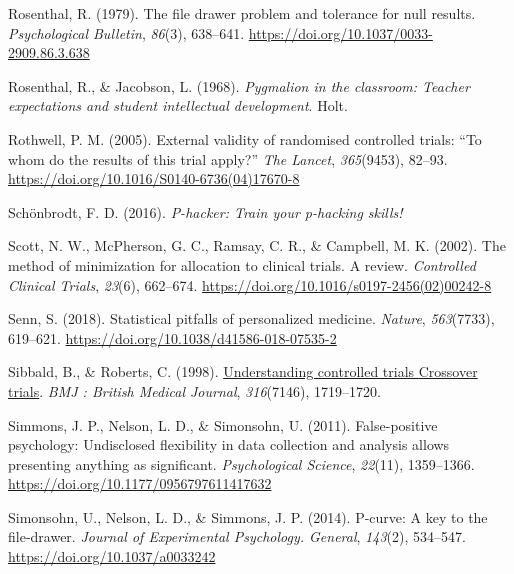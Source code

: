 \documentclass{krantz}
\newlength{\cslhangindent}
\newlength{\cslentryspacingunit} %
\newenvironment{CSLReferences}[2] %
{%
\setlength{\parindent}{0pt}
\ifodd #1
\let\oldpar\par
\def\par{\hangindent=\cslhangindent\oldpar}
\fi
\setlength{\parskip}{#2\cslentryspacingunit}
}%
{}
\begin{document}
\begin{CSLReferences}{1}{0}
\leavevmode{}%
Rosenthal, R. (1979). The file drawer problem and tolerance for null results. \emph{Psychological Bulletin}, \emph{86}(3), 638--641. \url{https://doi.org/10.1037/0033-2909.86.3.638}

\leavevmode{}%
Rosenthal, R., \& Jacobson, L. (1968). \emph{Pygmalion in the classroom: {Teacher} expectations and student intellectual development}. {Holt}.

\leavevmode{}%
Rothwell, P. M. (2005). External validity of randomised controlled trials: {``{To} whom do the results of this trial apply?''} \emph{The Lancet}, \emph{365}(9453), 82--93. \url{https://doi.org/10.1016/S0140-6736(04)17670-8}

\leavevmode{}%
Schönbrodt, F. D. (2016). \emph{P-hacker: {Train} your p-hacking skills!}

\leavevmode{}%
Scott, N. W., McPherson, G. C., Ramsay, C. R., \& Campbell, M. K. (2002). The method of minimization for allocation to clinical trials. A review. \emph{Controlled Clinical Trials}, \emph{23}(6), 662--674. \url{https://doi.org/10.1016/s0197-2456(02)00242-8}

\leavevmode{}%
Senn, S. (2018). Statistical pitfalls of personalized medicine. \emph{Nature}, \emph{563}(7733), 619--621. \url{https://doi.org/10.1038/d41586-018-07535-2}

\leavevmode{}%
Sibbald, B., \& Roberts, C. (1998). \href{https://www.ncbi.nlm.nih.gov/pmc/articles/PMC1113275}{Understanding controlled trials {Crossover} trials}. \emph{BMJ : British Medical Journal}, \emph{316}(7146), 1719--1720.

\leavevmode{}%
Simmons, J. P., Nelson, L. D., \& Simonsohn, U. (2011). False-positive psychology: {Undisclosed} flexibility in data collection and analysis allows presenting anything as significant. \emph{Psychological Science}, \emph{22}(11), 1359--1366. \url{https://doi.org/10.1177/0956797611417632}

\leavevmode{}%
Simonsohn, U., Nelson, L. D., \& Simmons, J. P. (2014). P-curve: A key to the file-drawer. \emph{Journal of Experimental Psychology. General}, \emph{143}(2), 534--547. \url{https://doi.org/10.1037/a0033242}


\end{CSLReferences}
\end{document}
